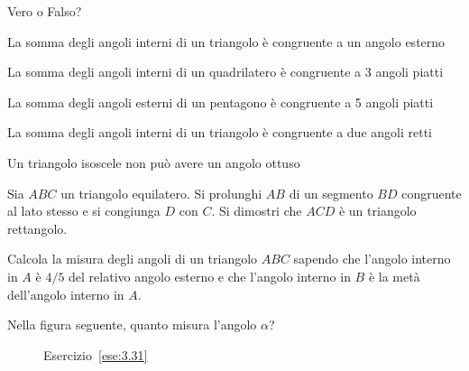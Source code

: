 \begin{esercizio}
\label{ese:3.47}
Vero o Falso?
\begin{enumeratea}
\item La somma degli angoli interni di un triangolo è congruente a un 
angolo esterno\tab\tab\hfill\boxV\quad\boxF
\item La somma degli angoli interni di un quadrilatero è congruente a 
3 angoli piatti\tab\tab\hfill\boxV\quad\boxF
\item La somma degli angoli esterni di un pentagono è congruente a 5 
angoli piatti\hfill\boxV\quad\boxF
\item La somma degli angoli interni di un triangolo è congruente a 
due angoli retti\hfill\boxV\quad\boxF
\item Un triangolo isoscele non può avere un angolo 
ottuso\hfill\boxV\quad\boxF
\end{enumeratea}
\end{esercizio}

\begin{esercizio}
\label{ese:3.48}
Sia $ABC$ un triangolo equilatero. Si prolunghi $AB$ di un segmento 
$BD$ congruente al lato stesso e si congiunga $D$ con $C$. Si 
dimostri che $ACD$ è un triangolo rettangolo.
\end{esercizio}

\begin{esercizio}
\label{ese:3.49}
Calcola la misura degli angoli di un triangolo $ABC$ sapendo che 
l'angolo interno in $A$ è $4/5$ del relativo angolo esterno e che 
l'angolo interno in $B$ è la metà dell'angolo interno in $A$.
\end{esercizio}

\begin{esercizio}
\label{ese:3.51}
Nella figura seguente, quanto misura l'angolo $\alpha$?  
\end{esercizio}

\begin{inaccessibleblock}
 \begin{figure}[htb]
\centering
\caption{Esercizio~\ref{ese:3.31}}\label{fig:ese3.51}
\end{figure}
\end{inaccessibleblock}



